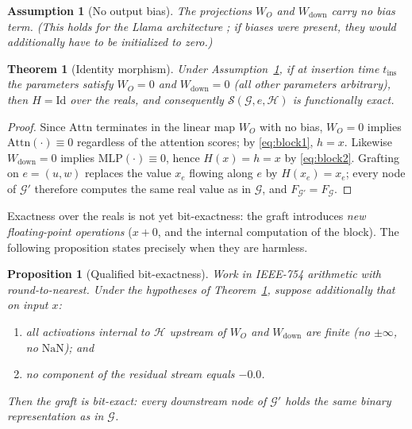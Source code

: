 \documentclass[11pt,a4paper]{article}
\newtheorem{theorem}{Theorem}
\newtheorem{proposition}{Proposition}
\newtheorem{assumption}{Assumption}
\newcommand{\G}{\mathcal{G}}
\newcommand{\Gp}{\mathcal{G}'}
\newcommand{\Hb}{\mathcal{H}}
\newcommand{\Surg}{\mathcal{S}}
\begin{document}
\begin{assumption}[No output bias]
\label{ass:nobias}
The projections $W_O$ and $W_{\mathrm{down}}$ carry no bias term. (This holds for the Llama architecture \cite{llama}; if biases were present, they would additionally have to be initialized to zero.)
\end{assumption}

\begin{theorem}[Identity morphism]
\label{thm:identity}
Under Assumption~\ref{ass:nobias}, if at insertion time $t_{\mathrm{ins}}$ the parameters satisfy $W_O = 0$ and $W_{\mathrm{down}} = 0$ (all other parameters arbitrary), then $H = \mathrm{Id}$ over the reals, and consequently $\Surg(\G, e, \Hb)$ is functionally exact.
\end{theorem}

\begin{proof}
Since $\mathrm{Attn}$ terminates in the linear map $W_O$ with no bias, $W_O = 0$ implies $\mathrm{Attn}(\cdot) \equiv 0$ regardless of the attention scores; by \eqref{eq:block1}, $h = x$. Likewise $W_{\mathrm{down}} = 0$ implies $\mathrm{MLP}(\cdot) \equiv 0$, hence $H(x) = h = x$ by \eqref{eq:block2}. Grafting on $e = (u,w)$ replaces the value $x_e$ flowing along $e$ by $H(x_e) = x_e$; every node of $\Gp$ therefore computes the same real value as in $\G$, and $F_{\Gp} = F_{\G}$.
\end{proof}

Exactness over the reals is not yet bit-exactness: the graft introduces \emph{new floating-point operations} ($x + 0$, and the internal computation of the block). The following proposition states precisely when they are harmless.

\begin{proposition}[Qualified bit-exactness]
\label{prop:bitexact}
Work in IEEE-754 arithmetic with round-to-nearest. Under the hypotheses of Theorem~\ref{thm:identity}, suppose additionally that on input $x$:
\begin{enumerate}
    \item all activations internal to $\Hb$ upstream of $W_O$ and $W_{\mathrm{down}}$ are finite (no $\pm\infty$, no $\mathrm{NaN}$); and
    \item no component of the residual stream equals $-0.0$.
\end{enumerate}
Then the graft is bit-exact: every downstream node of $\Gp$ holds the same binary representation as in $\G$.
\end{proposition}
\end{document}
